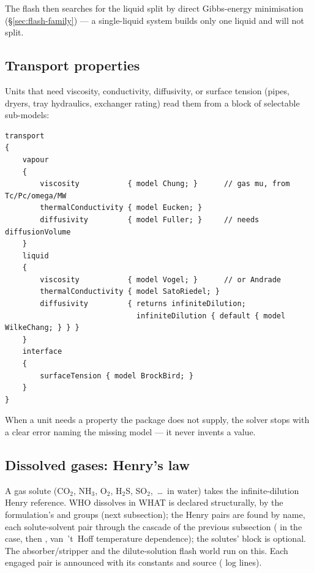\documentclass[11pt,a4paper]{article}
\begin{document}
The flash then searches for the liquid split by direct Gibbs-energy
minimisation (\S\ref{sec:flash-family}) --- a single-liquid
 system builds only one liquid and will not split.

\subsection{Transport properties}

Units that need viscosity, conductivity, diffusivity, or surface
tension (pipes, dryers, tray hydraulics, exchanger rating) read them
from a  block of selectable sub-models:

\begin{lstlisting}[language=dict]
transport
{
    vapour
    {
        viscosity           { model Chung; }      // gas mu, from Tc/Pc/omega/MW
        thermalConductivity { model Eucken; }
        diffusivity         { model Fuller; }     // needs diffusionVolume
    }
    liquid
    {
        viscosity           { model Vogel; }      // or Andrade
        thermalConductivity { model SatoRiedel; }
        diffusivity         { returns infiniteDilution;
                              infiniteDilution { default { model WilkeChang; } } }
    }
    interface
    {
        surfaceTension { model BrockBird; }
    }
}
\end{lstlisting}

When a unit needs a property the package does not supply, the solver
stops with a clear error naming the missing model --- it never invents
a value.

\subsection{Dissolved gases: Henry's law}

A gas solute (CO$_2$, NH$_3$, O$_2$, H$_2$S, SO$_2$,~\dots\ in water)
takes the infinite-dilution Henry reference.  WHO dissolves in WHAT is
declared structurally, by the  formulation's
 and  groups (next subsection); the
Henry pairs are found by name, each solute-solvent pair through the cascade of the
previous subsection ( in the
case, then , van~'t~Hoff temperature
dependence); the solutes'  block is optional.  The absorber/stripper and the
dilute-solution flash world run on this.  Each engaged pair is announced
with its constants and source (\code{[henry]} log lines).
\end{document}
